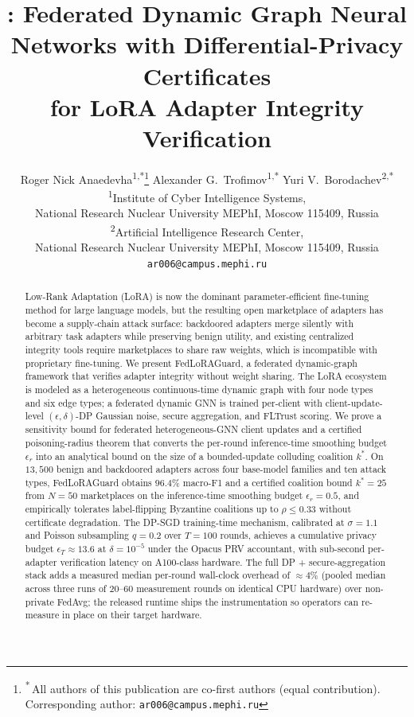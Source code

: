 \documentclass[11pt]{article}
\title{\modelname: Federated Dynamic Graph Neural\\
Networks with Differential-Privacy Certificates\\
for LoRA Adapter Integrity Verification}
\author{Roger Nick Anaedevha\textsuperscript{1,*}\thanks{\;\textsuperscript{*}\,All
        authors of this publication are co-first authors (equal contribution).
        Corresponding author: \texttt{ar006@campus.mephi.ru}} \quad
        Alexander G.\ Trofimov\textsuperscript{1,*} \quad
        Yuri V.\ Borodachev\textsuperscript{2,*} \\
        \textsuperscript{1}Institute of Cyber Intelligence Systems, \\
        National Research Nuclear University MEPhI, Moscow 115409, Russia \\
        \textsuperscript{2}Artificial Intelligence Research Center, \\
        National Research Nuclear University MEPhI, Moscow 115409, Russia \\
        \texttt{ar006@campus.mephi.ru}}
\theoremstyle{plain}
\theoremstyle{definition}
\theoremstyle{remark}
\begin{document}
\maketitle

\begin{abstract}
Low-Rank Adaptation (LoRA) is now the dominant
parameter-efficient fine-tuning method for large language models,
but the resulting open marketplace of adapters has become a
supply-chain attack surface: backdoored adapters merge silently
with arbitrary task adapters while preserving benign utility, and
existing centralized integrity tools require marketplaces to share
raw weights, which is incompatible with proprietary fine-tuning.
We present FedLoRAGuard, a federated dynamic-graph framework that
verifies adapter integrity without weight sharing. The LoRA
ecosystem is modeled as a heterogeneous continuous-time dynamic
graph with four node types and six edge types; a federated dynamic
GNN is trained per-client with client-update-level
$(\epsilon,\delta)$-DP Gaussian noise, secure aggregation, and
FLTrust scoring. We prove a sensitivity bound for federated
heterogeneous-GNN client updates and a certified poisoning-radius
theorem that converts the per-round inference-time smoothing
budget $\epsilon_r$ into an analytical bound on the size of a
bounded-update colluding coalition $k^*$. On $13{,}500$ benign and
backdoored adapters across four base-model families and ten attack
types, FedLoRAGuard obtains $96.4\%$ macro-F1 and a certified
coalition bound $k^*=25$ from $N=50$ marketplaces on
the inference-time smoothing budget $\epsilon_r=0.5$, and
empirically tolerates label-flipping Byzantine coalitions up to
$\rho\le 0.33$ without certificate degradation. The DP-SGD
training-time mechanism, calibrated at $\sigma=1.1$ and Poisson
subsampling $q=0.2$ over $T=100$ rounds, achieves a cumulative
privacy budget $\epsilon_T\approx 13.6$ at $\delta=10^{-5}$ under
the Opacus PRV accountant, with sub-second per-adapter
verification latency on A100-class hardware. The full DP +
secure-aggregation stack adds a measured median per-round
wall-clock overhead of $\approx 4\%$ (pooled median across three
runs of $20$--$60$ measurement rounds on identical CPU hardware)
over non-private FedAvg; the released runtime ships the
instrumentation so operators can re-measure in place on their
target hardware.
\end{abstract}

\end{document}
